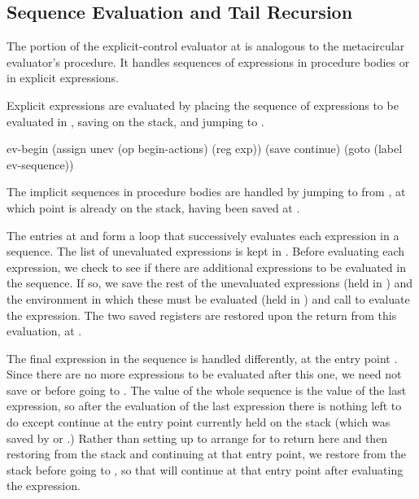 \subsection{Sequence Evaluation and Tail Recursion}
\label{Section 5.4.2}

The portion of the explicit-control evaluator at  is
analogous to the metacircular evaluator's  procedure.  It
handles sequences of expressions in procedure bodies or in explicit
 expressions.

Explicit  expressions are evaluated by placing the sequence of
expressions to be evaluated in , saving  on the
stack, and jumping to .

\begin{codeBlock}
ev-begin
  (assign unev (op begin-actions) (reg exp))
  (save continue)
  (goto (label ev-sequence))
\end{codeBlock}

\noindent
The implicit sequences in procedure bodies are handled by jumping to
 from , at which point 
is already on the stack, having been saved at .

The entries at  and  form a loop
that successively evaluates each expression in a sequence.  The list of
unevaluated expressions is kept in .  Before evaluating each
expression, we check to see if there are additional expressions to be evaluated
in the sequence.  If so, we save the rest of the unevaluated expressions (held
in ) and the environment in which these must be evaluated (held in
) and call  to evaluate the expression.  The two
saved registers are restored upon the return from this evaluation, at
.

The final expression in the sequence is handled differently, at the entry point
.  Since there are no more expressions to be
evaluated after this one, we need not save  or  before
going to .  The value of the whole sequence is the value of
the last expression, so after the evaluation of the last expression there is
nothing left to do except continue at the entry point currently held on the
stack (which was saved by  or .)  Rather
than setting up  to arrange for  to return
here and then restoring  from the stack and continuing at that
entry point, we restore  from the stack before going to
, so that  will continue at that entry
point after evaluating the expression.

